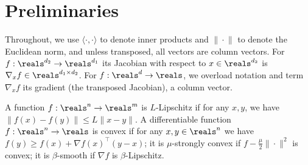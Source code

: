 \section{Preliminaries}\label{sec:preliminaries}
Throughout, we use $\langle \cdot{}, {}\cdot\rangle$ to denote inner products and $\|{}\cdot{}\|$ to denote the Euclidean norm, and unless transposed, all vectors are column vectors. For $f:\reals^{d_2}\to\reals^{d_1}$ its Jacobian with respect to $x\in \reals^{d_2}$ is 
$\nabla_x f\in \reals^{d_1 \times d_2}$.  For $f:\reals^d\to\reals$, we overload notation and term $\nabla_x f$ its gradient (the transposed Jacobian), a column vector. 

A function $f:\reals^n\to\reals^m$ is $L$-Lipschitz if for any $x,y$, we have $\|f(x) - f(y)\|\leq L \|x-y\|$.
A differentiable function $f:\reals^n\to\reals$ is convex if for any $x, y\in \reals^n$ we have $f(y)\geq f(x) + \nabla f(x)^\top (y-x)$; 
it is 
 $\mu$-strongly convex
 if $f - \tfrac{\mu}{2}\|{}\cdot{}\|^2$ is convex;
it is  $\beta$-smooth
if
$\nabla f$ is $\beta$-Lipschitz.


